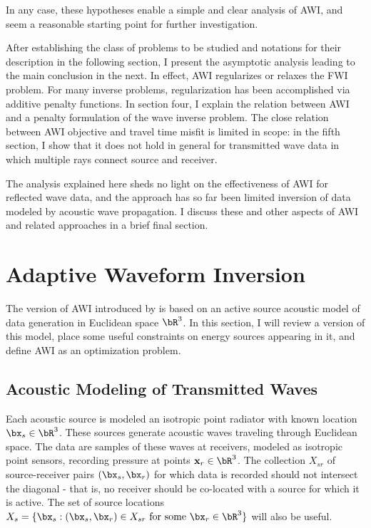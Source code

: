 In any case, these hypotheses enable a simple and clear
analysis of AWI, and seem a reasonable starting point for further
investigation.

After establishing the class of problems to be studied and notations
for their description in the following section, I present the
asymptotic analysis leading to the main conclusion in the next. In
effect, AWI regularizes or relaxes the FWI problem. For many inverse
problems, regularization has been accomplished via additive penalty
functions. In section four, I explain the relation between AWI and a
penalty formulation of the wave inverse problem. The close relation
between AWI objective and travel time misfit is limited in scope: in
the fifth section, I show that it does not hold in general for
transmitted wave data in which multiple rays connect source and
receiver.

The analysis explained here sheds no light on the effectiveness of AWI
for reflected wave data, and the approach has so far been limited
inversion of data modeled by acoustic wave propagation. I discuss
these and other aspects of AWI and related approaches in a brief final
section.

\section{Adaptive Waveform Inversion}

The version of AWI introduced by \cite{Warner:16} is based on an
active source acoustic model of data generation in Euclidean space
$\bR^3$. In this section, I will review a version of this model, place
some useful constraints on energy sources appearing in it, and define
AWI as an optimization problem.

\subsection{Acoustic Modeling of Transmitted Waves}

Each acoustic source is modeled an isotropic point radiator
with known location $\bx_s\in \bR^3$. These
sources generate acoustic waves traveling through Euclidean space. The
data are samples of these waves at receivers, modeled as isotropic
point sensors, recording pressure at points
${\bf x}_r \in \bR^3$. The collection $X_{sr}$ of source-receiver pairs
$(\bx_s,\bx_r)$ for which data is recorded should not intersect the
diagonal - that is, no receiver should be co-located with a source for
which it is active. The set of source locations $X_s = \{\bx_s: (\bx_s,\bx_r) \in X_{sr}
\mbox{ for some } \bx_r \in \bR^3\}$ will also be useful.


